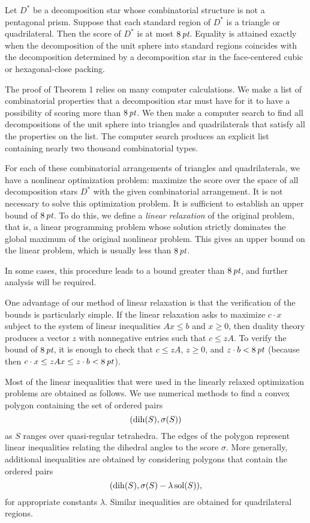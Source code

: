  Let $D^*$ be a decomposition star whose combinatorial
structure is not a pentagonal prism.
Suppose that
each standard region of $D^*$ is a triangle or quadrilateral.
Then the score
of $D^*$ is at most $8\,\hbox{\it pt}$.  Equality is attained exactly
when the decomposition of the unit sphere into standard regions
coincides with the decomposition determined by a decomposition star in
the face-centered cubic or hexagonal-close packing.
\endproclaim

The proof of Theorem 1 relies on many computer calculations.
We make a list of combinatorial properties that a decomposition
star must have for it to have a possibility of scoring more
than $8\,\hbox{\it pt}$.  We then make a computer
search to find all decompositions of the unit sphere into
triangles and quadrilaterals that satisfy all the properties
on the list.  The computer search produces an explicit
list containing nearly two thousand 
combinatorial types. 

For each of these combinatorial arrangements 
of triangles and quadrilaterals,
we have a nonlinear optimization problem:  maximize the
score over the space of all decomposition stars $D^*$ with
the given combinatorial arrangement.
It is not necessary to solve this optimization problem. It is
sufficient to establish an upper bound of $8\,\hbox{\it pt}$.  To do this,
we define a {\it linear relaxation\/} of the original problem,
that is, a linear programming 
problem whose solution strictly dominates the
global maximum of the original nonlinear problem. 
This gives an upper
bound on the linear problem,  which is usually less than 
$8\,\hbox{\it pt}$.

In some cases, this procedure leads to a bound
greater than $8\,\hbox{\it pt}$, and further analysis will be required.

One advantage of our method of linear relaxation
is that the verification of
the bounds is particularly simple.  If the linear relaxation
asks to maximize $c\cdot x$ subject to the system of linear inequalities
$Ax\le b$ and  $x\ge0$, then duality theory produces a vector $z$
with nonnegative entries such that $c\le zA$.  
To verify the bound of $8\,\hbox{\it pt}$, it is enough to
check that  $c\le zA$, $z\ge0$, and  $z\cdot b<8\,\hbox{\it pt}$ (because
then $c\cdot x \le z A x \le z\cdot b < 8\,\hbox{\it pt}$).

\medskip
Most of the linear inequalities that were used in the
linearly relaxed optimization problems are obtained as
follows.  We use numerical methods to find a convex
polygon containing the set of ordered pairs
$$(\operatorname{dih}(S), \sigma(S))$$
as $S$ ranges over quasi-regular tetrahedra.  
  The edges of the polygon represent linear inequalities
relating the dihedral angles to the score $\sigma$.  
More generally, additional inequalities are obtained by considering
polygons that contain the ordered pairs
$$(\operatorname{dih}(S),\sigma(S)-\lambda\operatorname{sol}(S)),$$
for appropriate constants $\lambda$.   Similar inequalities
are obtained for quadrilateral regions.

